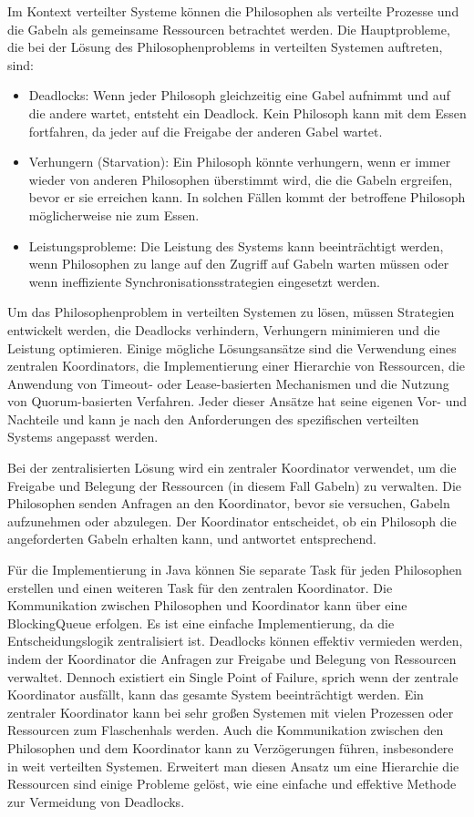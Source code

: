 Im Kontext verteilter Systeme können die Philosophen als verteilte Prozesse und die Gabeln als gemeinsame Ressourcen betrachtet werden. Die Hauptprobleme, die bei der Lösung des Philosophenproblems in verteilten Systemen auftreten, sind:
\begin{itemize}
\item Deadlocks: Wenn jeder Philosoph gleichzeitig eine Gabel aufnimmt und auf die andere wartet, entsteht ein Deadlock. Kein Philosoph kann mit dem Essen fortfahren, da jeder auf die Freigabe der anderen Gabel wartet.
\item Verhungern (Starvation): Ein Philosoph könnte verhungern, wenn er immer wieder von anderen Philosophen überstimmt wird, die die Gabeln ergreifen, bevor er sie erreichen kann. In solchen Fällen kommt der betroffene Philosoph möglicherweise nie zum Essen.
\item Leistungsprobleme: Die Leistung des Systems kann beeinträchtigt werden, wenn Philosophen zu lange auf den Zugriff auf Gabeln warten müssen oder wenn ineffiziente Synchronisationsstrategien eingesetzt werden.
\end{itemize}

Um das Philosophenproblem in verteilten Systemen zu lösen, müssen Strategien entwickelt werden, die Deadlocks verhindern, Verhungern minimieren und die Leistung optimieren. Einige mögliche Lösungsansätze sind die Verwendung eines zentralen Koordinators, die Implementierung einer Hierarchie von Ressourcen, die Anwendung von Timeout- oder Lease-basierten Mechanismen und die Nutzung von Quorum-basierten Verfahren. Jeder dieser Ansätze hat seine eigenen Vor- und Nachteile und kann je nach den Anforderungen des spezifischen verteilten Systems angepasst werden.

Bei der zentralisierten Lösung wird ein zentraler Koordinator verwendet, um die Freigabe und Belegung der Ressourcen (in diesem Fall Gabeln) zu verwalten. Die Philosophen senden Anfragen an den Koordinator, bevor sie versuchen, Gabeln aufzunehmen oder abzulegen. Der Koordinator entscheidet, ob ein Philosoph die angeforderten Gabeln erhalten kann, und antwortet entsprechend.

Für die Implementierung in Java können Sie separate Task für jeden Philosophen erstellen und einen weiteren Task für den zentralen Koordinator. Die Kommunikation zwischen Philosophen und Koordinator kann über eine BlockingQueue erfolgen.
Es ist eine einfache Implementierung, da die Entscheidungslogik zentralisiert ist. Deadlocks können effektiv vermieden werden, indem der Koordinator die Anfragen zur Freigabe und Belegung von Ressourcen verwaltet.
Dennoch existiert ein Single Point of Failure, sprich wenn der zentrale Koordinator ausfällt, kann das gesamte System beeinträchtigt werden.
Ein zentraler Koordinator kann bei sehr großen Systemen mit vielen Prozessen oder Ressourcen zum Flaschenhals werden. Auch die Kommunikation zwischen den Philosophen und dem Koordinator kann zu Verzögerungen führen, insbesondere in weit verteilten Systemen.
Erweitert man diesen Ansatz um eine Hierarchie die Ressourcen sind einige Probleme gelöst, wie eine einfache und effektive Methode zur Vermeidung von Deadlocks.

